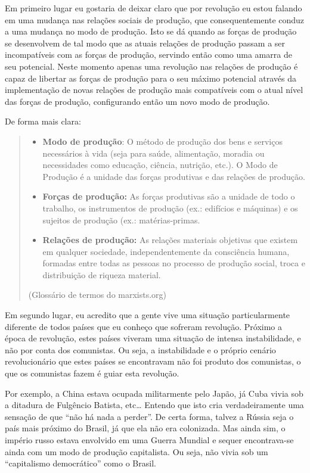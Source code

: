 Em primeiro lugar eu gostaria de deixar claro que por revolução eu estou falando em uma mudança nas relações sociais de produção, que consequentemente conduz a uma mudança no modo de produção. Isto se dá quando as forças de produção se desenvolvem de tal modo que as atuais relações de produção passam a ser incompatíveis com as forças de produção, servindo então como uma amarra de seu potencial. Neste momento apenas uma revolução nas relações de produção é capaz de libertar as forças de produção para o seu máximo potencial através da implementação de novas relações de produção mais compatíveis com o atual nível das forças de produção, configurando então um novo modo de produção.

De forma mais clara:

\begin{quote}
\begin{itemize}
\item \textbf{Modo de produção}: O método de produção dos bens e serviços necessários à vida (seja para saúde, alimentação, moradia ou necessidades como educação, ciência, nutrição, etc.). O Modo de Produção é a unidade das forças produtivas e das relações de produção. 

\item \textbf{Forças de produção:} As forças produtivas são a unidade de todo o trabalho, os instrumentos de produção (ex.: edifícios e máquinas) e os sujeitos de produção (ex.: matérias-primas. 

\item \textbf{Relações de produção:} As relações materiais objetivas que existem em qualquer sociedade, independentemente da consciência humana, formadas entre todas as pessoas no processo de produção social, troca e distribuição de riqueza material.
\end{itemize}
(Glossário de termos do marxists.org)
\end{quote}
Em segundo lugar, eu acredito que a gente vive uma situação particularmente diferente de todos países que eu conheço que sofreram revolução. Próximo a época de revolução, estes países viveram uma situação de intensa instabilidade, e não por conta dos comunistas. Ou seja, a instabilidade e o próprio cenário revolucionário que estes países se encontravam não foi produto dos comunistas, o que os comunistas fazem é guiar esta revolução.

Por exemplo, a China estava ocupada militarmente pelo Japão, já Cuba vivia sob a ditadura de Fulgêncio Batista, etc… Entendo que isto cria verdadeiramente uma sensação de que “não há nada a perder”. De certa forma, talvez a Rússia seja o país mais próximo do Brasil, já que ela não era colonizada. Mas ainda sim, o império russo estava envolvido em uma Guerra Mundial e sequer encontrava-se ainda com um modo de produção capitalista. Ou seja, não vivia sob um “capitalismo democrático” como o Brasil.

